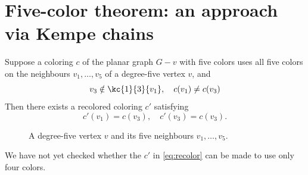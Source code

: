 \section{Five-color theorem: an approach via Kempe chains}

Suppose a coloring $c$ of the planar graph $G-v$ with five colors uses all five colors on the neighbours $v_1,\dots,v_5$ of a degree-five vertex $v$, and
\begin{equation}\label{eq:kempe}
  v_3 \notin \kc{1}{3}{v_1}, \quad c(v_1) \ne c(v_3)
\end{equation}
Then there exists a recolored coloring $c'$ satisfying
\begin{equation}\label{eq:recolor}
  c'(v_1) = c(v_3), \quad c'(v_3) = c(v_3).
\end{equation}

\begin{figure}[h]
  \centering
  \caption{A degree-five vertex $v$ and its five neighbours $v_1,\dots,v_5$.}
\end{figure}

We have not yet checked whether the $c'$ in \eqref{eq:recolor} can be made to use only four colors.
